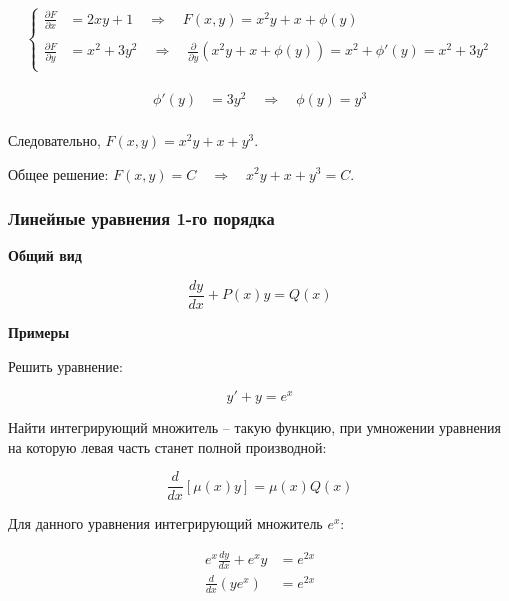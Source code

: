 \begin{align*}
    \begin{cases}
        \frac{\partial F}{\partial x} &= 2xy + 1 \quad \Rightarrow \quad F(x,y) = x^2 y + x + \phi(y) \\
        \\
        \frac{\partial F}{\partial y} &= x^2 + 3y^2 \quad \Rightarrow \quad \frac{\partial}{\partial y}(x^2 y + x + \phi(y)) = x^2 + \phi'(y) = x^2 + 3y^2 \\
    \end{cases}
\end{align*}

\begin{align*}
    \phi'(y) &= 3y^2 \quad \Rightarrow \quad \phi(y) = y^3\\
\end{align*}

Следовательно, $F(x,y) = x^2 y + x + y^3$.

Общее решение: $F(x,y) = C \quad \Rightarrow \quad x^2 y + x + y^3 = C$.

\subsubsection{Линейные уравнения 1-го порядка}

\textbf{Общий вид}

\begin{equation*}
    \frac{dy}{dx} + P(x)y = Q(x)
\end{equation*}

\textbf{Примеры}

Решить уравнение:

\begin{equation*}
    y' + y = e^x
\end{equation*}

Найти интегрирующий множитель -- такую функцию, при умножении уравнения на которую левая часть станет полной производной:

\begin{equation*}
    \frac{d}{dx} [\mu(x)y] = \mu(x) Q(x)
\end{equation*}

Для данного уравнения интегрирующий множитель $e^x$:

\begin{align*}
    e^x \frac{dy}{dx} + e^x y &= e^{2x} \\
    \frac{d}{dx}(y e^x) &= e^{2x}
\end{align*}

